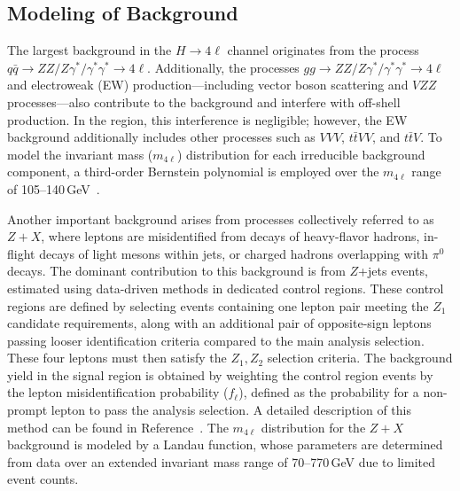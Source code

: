 
\subsection{Modeling of Background}

The largest background in the $H \to 4\ell$ channel originates from the process $q\bar{q} \to ZZ/Z\gamma^*/\gamma^*\gamma^* \to 4\ell$. Additionally, the processes $gg \to ZZ/Z\gamma^*/\gamma^*\gamma^* \to 4\ell$ and electroweak (EW) production---including vector boson scattering and $VZZ$ processes---also contribute to the background and interfere with off-shell \Hboson production. In the \onshell region, this interference is negligible; however, the EW background additionally includes other processes such as $VVV$, $t\bar{t}VV$, and $t\bar{t}V$. To model the invariant mass ($m_{4\ell}$) distribution for each irreducible background component, a third-order Bernstein polynomial is employed over the $m_{4\ell}$ range of 105--140\,GeV~\cite{PhysRevD.111.092014}.

Another important background arises from processes collectively referred to as $Z+X$, where leptons are misidentified from decays of heavy-flavor hadrons, in-flight decays of light mesons within jets, or charged hadrons overlapping with $\pi^0$ decays. The dominant contribution to this background is from $Z$+jets events, estimated using data-driven methods in dedicated control regions. These control regions are defined by selecting events containing one lepton pair meeting the ${Z}_{1}$ candidate requirements, along with an additional pair of opposite-sign leptons passing looser identification criteria compared to the main analysis selection. These four leptons must then satisfy the ${Z}_{1}, {Z}_{2}$ selection criteria. The background yield in the signal region is obtained by weighting the control region events by the lepton misidentification probability ($f_{\ell}$), defined as the probability for a non-prompt lepton to pass the analysis selection. A detailed description of this method can be found in Reference~\cite{Sirunyan:2017exp}. The $m_{4\ell}$ distribution for the $Z+X$ background is modeled by a Landau function, whose parameters are determined from data over an extended invariant mass range of 70--770\,GeV due to limited event counts.

